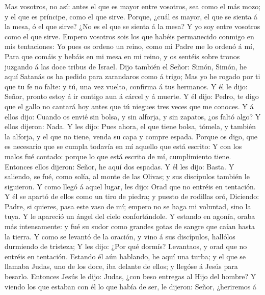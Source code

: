  Mas vosotros, no así: antes el que es mayor entre
vosotros, sea como el más mozo; y el que es príncipe, como el que sirve.
 Porque, ¿cuál es mayor, el que se sienta á la mesa, ó el
que sirve? ¿No es el que se sienta á la mesa? Y yo soy entre vosotros
como el que sirve.  Empero vosotros sois los que habéis
permanecido conmigo en mis tentaciones:  Yo pues os ordeno
un reino, como mi Padre me lo ordenó á mí,  Para que comáis
y bebáis en mi mesa en mi reino, y os sentéis sobre tronos juzgando á
las doce tribus de Israel.  Dijo también el Señor: Simón,
Simón, he aquí Satanás os ha pedido para zarandaros como á trigo;
 Mas yo he rogado por ti que tu fe no falte: y tú, una vez
vuelto, confirma á tus hermanos.  Y él le dijo: Señor,
pronto estoy á ir contigo aun á cárcel y á muerte.  Y él
dijo: Pedro, te digo que el gallo no cantará hoy antes que tú niegues
tres veces que me conoces.  Y á ellos dijo: Cuando os envié
sin bolsa, y sin alforja, y sin zapatos, ¿os faltó algo? Y ellos
dijeron: Nada.  Y les dijo: Pues ahora, el que tiene bolsa,
tómela, y también la alforja, y el que no tiene, venda su capa y compre
espada.  Porque os digo, que es necesario que se cumpla
todavía en mí aquello que está escrito: Y con los malos fué contado:
porque lo que está escrito de mí, cumplimiento tiene. 
Entonces ellos dijeron: Señor, he aquí dos espadas. Y él les dijo:
Basta.  Y saliendo, se fué, como solía, al monte de las
Olivas; y sus discípulos también le siguieron.  Y como
llegó á aquel lugar, les dijo: Orad que no entréis en tentación.
 Y él se apartó de ellos como un tiro de piedra; y puesto
de rodillas oró,  Diciendo: Padre, si quieres, pasa este
vaso de mí; empero no se haga mi voluntad, sino la tuya.  Y
le apareció un ángel del cielo confortándole.  Y estando en
agonía, oraba más intensamente: y fué su sudor como grandes gotas de
sangre que caían hasta la tierra.  Y como se levantó de la
oración, y vino á sus discípulos, hallólos durmiendo de tristeza;
 Y les dijo: ¿Por qué dormís? Levantaos, y orad que no
entréis en tentación.  Estando él aún hablando, he aquí una
turba; y el que se llamaba Judas, uno de los doce, iba delante de ellos;
y llegóse á Jesús para besarlo.  Entonces Jesús le dijo:
Judas, ¿con beso entregas al Hijo del hombre?  Y viendo los
que estaban con él lo que había de ser, le dijeron: Señor, ¿heriremos á
